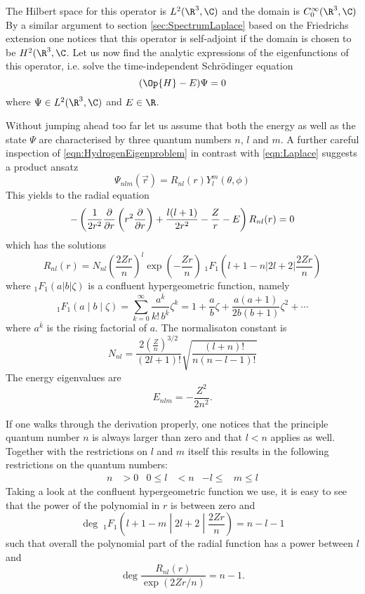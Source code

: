 The Hilbert space for this operator is $L^2(\R^3, \C)$
and the domain is $C^\infty_0(\R^3, \C)$
By a similar argument to section \vref{sec:SpectrumLaplace} based on the
Friedrichs extension one notices that this operator is self-adjoint
if the domain is chosen to be $H^2(\R^3, \C$.
Let us now find the analytic expressions of the eigenfunctions of this operator,
i.e. solve the time-independent Schrödinger equation
\begin{equation}
	( \Op{H} - E ) \Psi = 0
	\label{eqn:HydrogenEigenproblem}
\end{equation}
where $\Psi \in L^2(\R^3, \C)$ and $E \in \R$.

Without jumping ahead too far let us assume that both the energy as well
as the state $\Psi$ are characterised by three quantum numbers $n$, $l$ and $m$.
A further careful inspection of \eqref{eqn:HydrogenEigenproblem}
in contrast with \eqref{eqn:Laplace} suggests a product ansatz
\[ \Psi_{nlm}(\vec{r}) = R_{nl}(r) Y_l^m(\theta, \phi) \]
This yields to the radial equation
\begin{equation}
	- \left( \frac{1}{2r^2} \frac{\partial}{\partial r} \left( r^2 \frac{\partial}{\partial r} \right) + \frac{l (l+1)}{2 r^2} - \frac{Z}{r} - E \right) R_{nl}(r) = 0
	\label{eqn:HydrogenRadial}
\end{equation}
which has the solutions~\cite{Mueller2000}
\begin{equation}
	 R_{nl}(r) = N_{nl} \left(\frac{2Zr}{n}\right)^l \exp\left(-\frac{Zr}{n} \right)
\;_1F_1\left(l+1-n | 2l+2|\frac{2Zr}{n}\right)
	\label{eqn:HydrogenRadialSolution}
\end{equation}
where $_1F_1\left(a|b|\zeta\right)$ is a confluent hypergeometric function,
namely~\cite{Avery2006}
\[ _1F_1\left(a \middle| b \middle| \zeta\right) =
\sum_{k=0}^\infty \frac{a^{\bar{k}}}{k! \, b^{\bar{k}}} \zeta^k =
1 + \frac{a}{b} \zeta + \frac{a(a+1)}{2b(b+1)} \zeta^2 + \cdots \]
where $a^{\bar{k}}$ is the rising factorial of $a$.
The normalisaton constant is
\[ N_{nl} = \frac{2 \left( \frac{Z}{n} \right)^{3/2}}{(2l+1)!} \sqrt{ \frac{(l+n)!}{n (n-l-1)!}} \]
The energy eigenvalues are
\[ E_{nlm} = - \frac{Z^2}{2n^2}. \]

If one walks through the derivation properly,
one notices that the principle quantum number $n$ is always larger than zero
and that $l < n$ applies as well.
Together with the restrictions on $l$ and $m$ itself this results in the
following restrictions on the quantum numbers:
\begin{align*}
	n &> 0 & 0 \leq l &< n & -l \leq &m \leq l
\end{align*}
Taking a look at the confluent hypergeometric function we use, it is easy to see
that the power of the polynomial in $r$ is between zero and
\[
	\deg \;_1F_1\left(l + 1 -m \middle| 2l+2 \middle| \frac{2Zr}{n} \right) = n - l -1 \]
such that overall the polynomial part of the radial function
has a power between $l$ and
\[ \deg \frac{R_{nl}(r)}{\exp(2Zr/n)} = n - 1. \]

